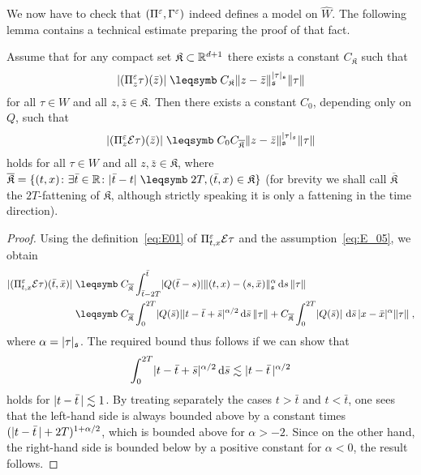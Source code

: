 \documentclass[reqno,11pt]{article}
\def\fraks{\mathfrak{s}}
\def\fraK{\mathfrak{K}}
\def\fraKbar{\overline{\mathfrak{K}}}
\def\abss#1{\abs{#1}_\mathfrak{s}}
\begin{document}
We now have to check that $(\Pi^\varepsilon,\Gamma^\varepsilon)$ indeed defines a model on
$\widehat{W}$. The following lemma contains a technical estimate preparing
the proof of that fact. 

\begin{lemma}
\label{lem:E_extension}
Assume that for any compact set $\fraK\subset\R^{d+1}$ there exists a constant
$C_\fraK$ such that 
\begin{equation}
\label{eq:E_05} 
 \abs{(\Pi^\eps_z\tau)(\bar z)} \leqs C_\fraK \norm{z-\bar
z}_\fraks^{\abss{\tau}} \norm{\tau}
\end{equation}
for all $\tau\in W$ and all $z,\bar z\in\fraK$. Then there exists a constant
$C_0$, depending only on $Q$, such that 
\begin{equation}
\label{eq:E_06} 
 \abs{(\Pi^\eps_z\cE\tau)(\bar z)} \leqs C_0C_{\fraKbar} \norm{z-\bar
z}_\fraks^{\abss{\tau}} \norm{\tau}
\end{equation}
holds for all $\tau\in W$ and all $z,\bar z\in\fraK$, where $\fraKbar =
\setsuch{(t,x)}{\exists \bar t\in\R\colon \abs{\bar t-t}\leqs 2T, (\bar
t,x)\in\fraK}$ (for brevity we shall call $\fraKbar$ the $2T$-fattening of
$\fraK$, although strictly speaking it is only a fattening in the time
direction). 
\end{lemma}
%
\begin{proof}
Using the definition~\eqref{eq:E01} of $\Pi^\varepsilon_{t,x}{\mathcal E}\tau$ and the
assumption~\eqref{eq:E_05}, we obtain 
\begin{align*}
 \abs{(\Pi^\eps_{t,x}\cE\tau)(\bar t,\bar x)}
 &\leqs C_{\fraKbar}\int_{\bar t-2T}^{\bar t} \abs{Q(\bar t-s)}
\norm{(t,x)-(s,\bar x)}^\alpha_\fraks \6s \, \norm{\tau} \\
 &\leqs C_{\fraKbar}\int_0^{2T} \abs{Q(\bar s)}\abs{t-\bar t+\bar s}^{\alpha/2}
\6\bar s\, \norm{\tau}
 + C_{\fraKbar} \int_0^{2T} \abs{Q(\bar s)}\,\6\bar s\,
\abs{x-\bar x}^\alpha \norm{\tau} \;,
\end{align*}
where $\alpha=\abss{\tau}$.
The required bound thus follows if we can show that 
\[
 \int_0^{2T} \abs{t-\bar t+\bar s}^{\alpha/2} \6\bar s 
 \lesssim \abs{t-\bar t\,}^{\alpha/2}
\]
holds for $\abs{t-\bar t\,}\lesssim 1$. By treating separately the cases $t>\bar
t$ and $t<\bar t$, one sees that the left-hand side is always bounded above by
a constant times $(\abs{t-\bar t\,}+2T)^{1+\alpha/2}$, which is bounded above
for $\alpha>-2$. Since on the other hand, the right-hand side is bounded below
by a positive constant for $\alpha<0$, the result follows. 
\end{proof}
\end{document}
